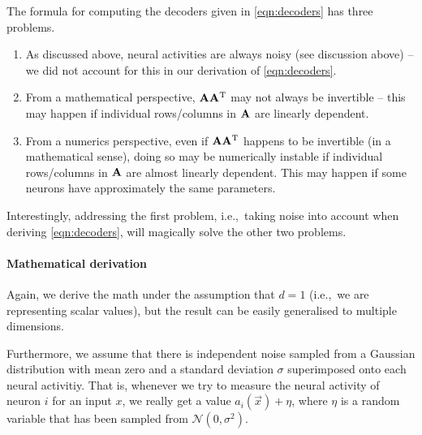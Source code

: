 \documentclass[10pt,letterpaper,oneside]{article}
\begin{document}
The formula for computing the decoders given in \cref{eqn:decoders} has three problems.
\begin{enumerate}[1.]
	\item As discussed above, neural activities are always noisy (see discussion above) -- we did not account for this in our derivation of \cref{eqn:decoders}.
	\item From a mathematical perspective, ${\mathbf{A}} {\mathbf{A}}^{\mathrm{T}}$ may not always be invertible -- this may happen if individual rows/columns in ${\mathbf{A}}$ are linearly dependent.
	\item From a numerics perspective, even if ${\mathbf{A}} {\mathbf{A}}^{\mathrm{T}}$ happens to be invertible (in a mathematical sense), doing so may be numerically instable if individual rows/columns in ${\mathbf{A}}$ are almost linearly dependent. This may happen if some neurons have approximately the same parameters.
\end{enumerate}
Interestingly, addressing the first problem, i.e.,~taking noise into account when deriving \cref{eqn:decoders}, will magically solve the other two problems.

\paragraph{Mathematical derivation}
Again, we derive the math under the assumption that $d = 1$ (i.e.,~we are representing scalar values), but the result can be easily generalised to multiple dimensions.

Furthermore, we assume that there is independent noise sampled from a Gaussian distribution with mean zero and a standard deviation $\sigma$ superimposed onto each neural activitiy. That is, whenever we try to measure the neural activity of neuron $i$ for an input $x$, we really get a value $a_i(\vec x) + \eta$, where $\eta$ is a random variable that has been sampled from $\mathcal{N}(0, \sigma^2)$.
\end{document}
